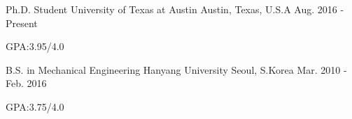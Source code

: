 

\begin{cventries}
  \cventry
    {Ph.D. Student} %
    {University of Texas at Austin} %
    {Austin, Texas, U.S.A} %
    {Aug. 2016 - Present} %
    {
      \begin{cvitems} %
        \item {GPA:3.95/4.0}
      \end{cvitems}
    }
  \cventry
    {B.S. in Mechanical Engineering} %
    {Hanyang University} %
    {Seoul, S.Korea} %
    {Mar. 2010 - Feb. 2016} %
    {
      \begin{cvitems} %
        \item {GPA:3.75/4.0}
      \end{cvitems}
    }

\end{cventries}
